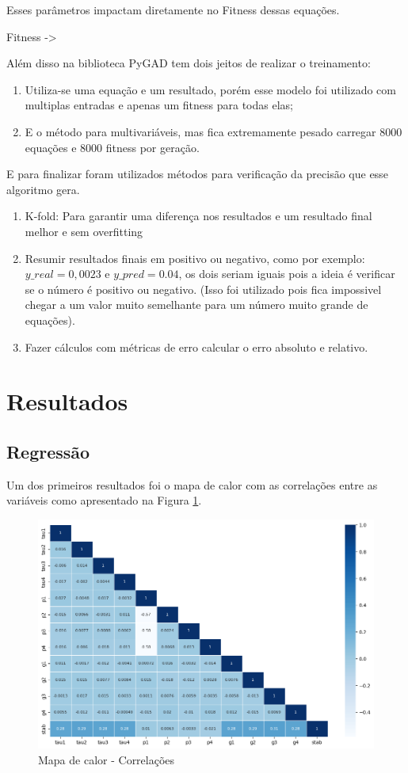 \documentclass[journal]{IEEEtran}
\begin{document}
Esses parâmetros impactam diretamente no Fitness dessas equações.

Fitness ->

Além disso na biblioteca PyGAD tem dois jeitos de realizar o treinamento:
\begin{enumerate}
    \item Utiliza-se uma equação e um resultado, porém esse modelo foi utilizado com multiplas entradas e apenas um fitness para todas elas;
    \item E o método para multivariáveis, mas fica extremamente pesado carregar 8000 equações e 8000 fitness por geração.
\end{enumerate}

E para finalizar foram utilizados métodos para verificação da precisão que esse algoritmo gera.
\begin{enumerate}
    \item K-fold: Para garantir uma diferença nos resultados e um resultado final melhor e sem overfitting
    \item Resumir resultados finais em positivo ou negativo, como por exemplo: $y\_real = 0,0023$ e $y\_pred = 0.04$, os dois seriam iguais pois a ideia é verificar se o número é positivo ou negativo. (Isso foi utilizado pois fica impossivel chegar a um valor muito semelhante para um número muito grande de equações).
    \item Fazer cálculos com métricas de erro calcular o erro absoluto e relativo.
\end{enumerate}

\section{Resultados}
\subsection{Regressão}
Um dos primeiros resultados foi o mapa de calor com as correlações entre as variáveis como apresentado na Figura \ref{fig:heatMapCorr}.

\begin{figure}[H]
    \centering
    \includegraphics[width=1\linewidth]{Mapa_calor_corr.png}
    \caption{Mapa de calor - Correlações}
    \label{fig:heatMapCorr}
\end{figure}
\end{document}
